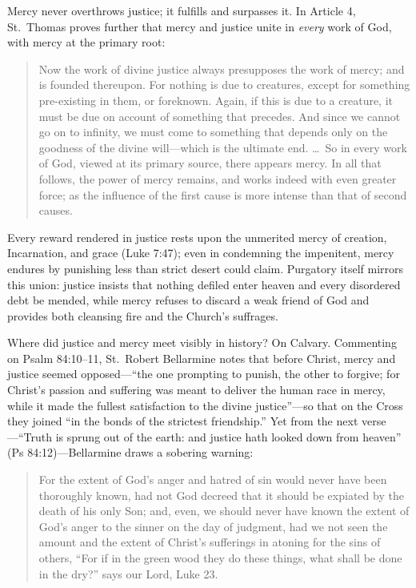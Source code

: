 Mercy never overthrows justice; it fulfills and surpasses it. In Article 4, St.\ Thomas proves further that mercy and justice unite in \textit{every} work of God, with mercy at the primary root:

\begin{quote}
Now the work of divine justice always presupposes the work of mercy; and is founded thereupon. For nothing is due to creatures, except for something pre-existing in them, or foreknown. Again, if this is due to a creature, it must be due on account of something that precedes. And since we cannot go on to infinity, we must come to something that depends only on the goodness of the divine will---which is the ultimate end. \dots\ So in every work of God, viewed at its primary source, there appears mercy. In all that follows, the power of mercy remains, and works indeed with even greater force; as the influence of the first cause is more intense than that of second causes.
\end{quote}

Every reward rendered in justice rests upon the unmerited mercy of creation, Incarnation, and grace (Luke 7:47); even in condemning the impenitent, mercy endures by punishing less than strict desert could claim. Purgatory itself mirrors this union: justice insists that nothing defiled enter heaven and every disordered debt be mended, while mercy refuses to discard a weak friend of God and provides both cleansing fire and the Church's suffrages.

Where did justice and mercy meet visibly in history? On Calvary. Commenting on Psalm 84:10--11, St.\ Robert Bellarmine notes that before Christ, mercy and justice seemed opposed---``the one prompting to punish, the other to forgive; for Christ's passion and suffering was meant to deliver the human race in mercy, while it made the fullest satisfaction to the divine justice''---so that on the Cross they joined ``in the bonds of the strictest friendship.'' Yet from the next verse---``Truth is sprung out of the earth: and justice hath looked down from heaven'' (Ps 84:12)---Bellarmine draws a sobering warning:

\begin{quote}
For the extent of God's anger and hatred of sin would never have been thoroughly known, had not God decreed that it should be expiated by the death of his only Son; and, even, we should never have known the extent of God's anger to the sinner on the day of judgment, had we not seen the amount and the extent of Christ's sufferings in atoning for the sins of others, ``For if in the green wood they do these things, what shall be done in the dry?'' says our Lord, Luke 23.
\end{quote}

